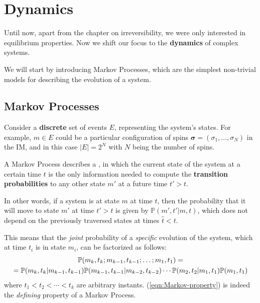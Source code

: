 \documentclass[../../main.tex]{subfiles}
\begin{document}
\chapter{Dynamics}
Until now, apart from the chapter on irreversibility, we were only interested in equilibrium properties. Now we shift our focus to the \textbf{dynamics} of complex systems. 

\medskip

We will start by introducing Markov Processes, which are the simplest non-trivial models for describing the evolution of a system.


\section{Markov Processes}
Consider a \textbf{discrete} set of events $E$, representing the system's states. For example, $m \in E$ could be a particular configuration of spins $\bm{\sigma} = (\sigma_1,\dots,\sigma_N)$ in the IM, and in this case $|E| = 2^N$ with $N$ being the number of spins. 

\medskip

A Markov Process describes a , in which the current state of the system at a certain time $t$ is the only information needed to compute the \textbf{transition probabilities} to any other state $m'$ at a future time $t' > t$. 

In other words, if a system is at state $m$ at time $t$, then the probability that it will move to state $m'$ at time $t' > t$ is given by $\mathbb{P}(m',t'|m,t)$, which does not depend on the previously traversed states at times $\hat{t} < t$.

\medskip

This means that the \textit{joint} probability of a \textit{specific} evolution of the system, which at time $t_i$ is in state $m_i$, can be factorized as follows:
\begin{align}\label{eqn:Markov-property}
    \mathbb{P}(m_k, t_k; m_{k-1}, t_{k-1}; \dots; m_1, t_1) = \span\\
    = \mathbb{P}(m_k, t_k|m_{k-1}, t_{k-1}) \mathbb{P}(m_{k-1}, t_{k-1}|m_{k-2}, t_{k-2}) \cdots \mathbb{P}(m_2, t_2|m_1, t_1) \mathbb{P}(m_1, t_1)\span \nonumber
\end{align}
where $t_1 < t_2 < \cdots < t_k$ are arbitrary instants.
(\ref{eqn:Markov-property}) is indeed the \textit{defining} property of a Markov Process.  
\end{document}
